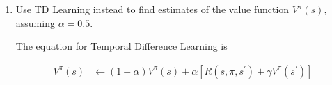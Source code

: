 \documentclass[12pt]{article}
\begin{document}
\begin{enumerate}
\begin{enumerate}
  \item Use TD Learning instead to find estimates of the value
    function $V^{\pi}(s)$, assuming $\alpha=0.5$.

    The equation for Temporal Difference Learning is

    \begin{align*}
      V^{\pi}(s) &\leftarrow (1 - \alpha)V^{\pi}(s) + \alpha\left[R(s,\pi,s^{\prime}) + \gamma V^{\pi}(s^{\prime})\right]
    \end{align*}

  \end{enumerate}

\end{enumerate}
\end{document}
